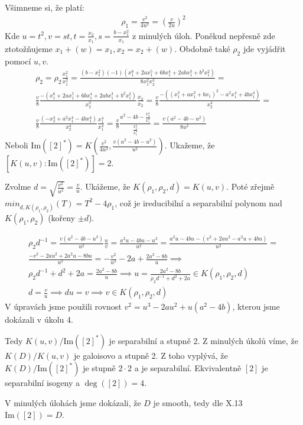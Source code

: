 \documentclass[12pt, a4paper]{article}
\begin{document}
Všimneme si, že platí:
\begin{gather*}
\rho_1 = \frac{v^2}{4u^2} = \left( \frac{v}{2u} \right)^2
\end{gather*}
Kde $u = t^2, v = st, t = \frac{x_2}{x_1}, s = \frac{b-x_1^2}{x_1}$ z minulých úloh. Poněkud nepřesně zde ztotožňujeme $x_1 + (w) = x_1, x_2= x_2 + (w)$. Obdobně také $\rho_2$ jde vyjádřit pomocí $u,v$. 
\begin{gather*}
\rho_2 = \rho_2  \frac{x_1^2}{x_1^2} = \frac{(b-x_1^2)(-1)(x_1^6+2ax_1^5+6bx_1^4+2abx_1^3+b^2x_1^2)}{8x_1^2x_2^3} = \\
\frac{v}{8} \frac{-(x_1^6+2ax_1^5+6bx_1^4+2abx_1^3+b^2x_1^2)}{x_2^3} \frac{x_2}{x_2} = \frac{v}{8} \frac{-((x_1^3+ax_1^2+bx_1)^2-a^2x_1^4+4bx_1^4)}{x_2^4} =\\
\frac{v}{8} \frac{(-x_2^4+a^2x_1^4-4bx_1^4)}{x_2^4} \frac{x_1^4}{x_1^4} = \frac{v}{8} \frac{a^2-4b-\frac{x_2^4}{x_1^4}}{\frac{x_2^4}{x_1^4}} = \frac{v(a^2-4b-u^2)}{8u^2}
\end{gather*}
Neboli $\text{Im}([2]^*) = K(\frac{v^2}{4u^2},\frac{v(a^2-4b-u^2)}{u^2})$. Ukažeme, že $[K(u,v):\text{Im}([2]^*)]=2$. 

Zvolme $d = \sqrt{\frac{v^2}{u^2}} = \frac{v}{u}$. Ukážeme, že $K(\rho_1,\rho_2,d)=K(u,v)$. Poté zřejmě $min_{d,K(\rho_1,\rho_2)}(T)=T^2-4\rho_1$, což je ireducibilní a separabilní polynom nad $K(\rho_1, \rho_2)$ (kořeny $\pm d$).

\begin{gather*}
\rho_2 d^{-1} = \frac{v(a^2-4b-u^2)}{u^2} \frac{u}{v} = \frac{a^2u-4bu-u^3}{u^2} = \frac{a^2u-4bu-(v^2+2au^2-a^2u+4bu)}{u^2} =\\
\frac{-v^2-2au^2+2a^2u-8bu}{u^2} = -\frac{v^2}{u^2} -2a + \frac{2a^2-8b}{u} \implies\\
\rho_2 d^{-1} + d^2 +2a = \frac{2a^2-8b}{u} \implies u = \frac{2a^2-8b}{\rho_2 d^{-1} + d^2 +2a} \in K(\rho_1, \rho_2, d)\\
d = \frac{v}{u} \implies d u = v \implies v \in K(\rho_1, \rho_2, d)
\end{gather*}
V úpravách jsme použili rovnost $v^2 = u^3-2au^2+u(a^2-4b)$, kterou jsme dokázali v úkolu 4.

Tedy $K(u,v)/\text{Im}([2]^*)$ je separabilní a stupně 2. Z minulých úkolů víme, že $K(D)/K(u,v)$ je galoisovo a stupně 2. Z toho vyplývá, že $K(D)/\text{Im}([2]^*)$ je stupně $2\cdot2$ a je separabilní. Ekvivalentně $[2]$ je separabilní isogeny a $\deg([2])=4$.

V minulých úlohách jsme dokázali, že $D$ je smooth, tedy dle X.13 $\text{Im}([2])=D$.
\end{document}
